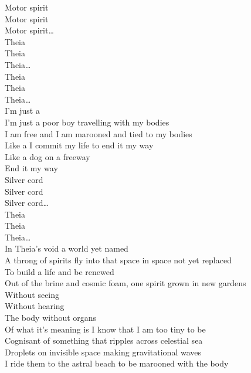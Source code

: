 
Motor spirit \\
Motor spirit \\
Motor spirit… \\

Theia \\
Theia \\
Theia… \\

Theia \\
Theia \\
Theia… \\

I'm just a  \\
I'm just a poor boy travelling with my bodies \\
I am free and I am marooned and tied to my bodies \\

Like a  I commit my life to end it my way \\
Like a dog on a freeway \\
End it my way \\

Silver cord \\
Silver cord \\
Silver cord… \\

Theia \\
Theia \\
Theia… \\

In Theia's void a world yet named \\
A throng of spirits fly into that space in space not yet replaced \\
To build a life and be renewed \\
Out of the brine and cosmic foam, one spirit grown in new gardens \\
Without seeing \\
Without hearing \\
The body without organs \\

Of what it's meaning is I know that I am too tiny to be \\
Cognisant of something that ripples across celestial sea \\
Droplets on invisible space making gravitational waves \\
I ride them to the astral beach to be marooned with the body \\

